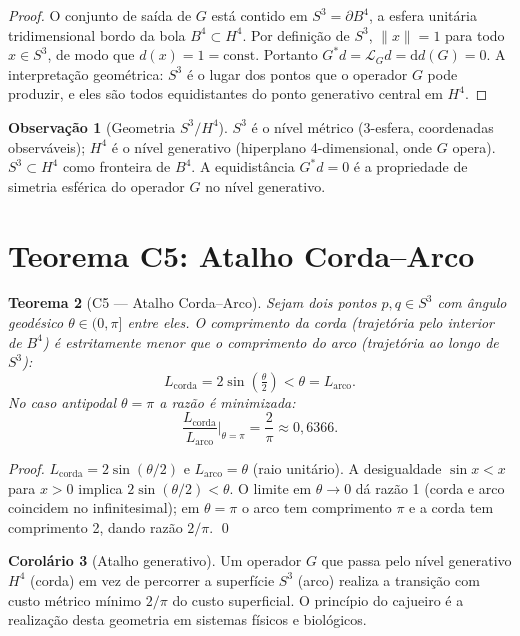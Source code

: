\documentclass[12pt,a4paper,twoside]{book}
\theoremstyle{plain}
\newtheorem{teorema}{Teorema}[section]
\theoremstyle{definition}
\newtheorem{corolario}[teorema]{Corolário}
\theoremstyle{definition}
\newtheorem{observacao}[teorema]{Observação}
\newcommand{\dd}{\mathrm{d}}
\begin{document}
\begin{proof}
O conjunto de saída de $G$ está contido em $S^{3} = \partial B^{4}$, a
esfera unitária tridimensional bordo da bola $B^{4} \subset H^{4}$.
Por definição de $S^{3}$, $\|x\| = 1$ para todo $x \in S^{3}$, de modo
que $d(x) = 1 = \text{const}$. Portanto $G^{*}d = \mathcal{L}_{G}d =
\dd d(G) = 0$. A interpretação geométrica: $S^{3}$ é o lugar dos pontos
que o operador $G$ pode produzir, e eles são todos equidistantes do ponto
generativo central em $H^{4}$.
\end{proof}

\begin{observacao}[Geometria $S^{3}/H^{4}$]
$S^{3}$ é o nível métrico (3-esfera, coordenadas observáveis);
$H^{4}$ é o nível generativo (hiperplano 4-dimensional, onde $G$ opera).
$S^{3} \subset H^{4}$ como fronteira de $B^{4}$. A equidistância
$G^{*}d = 0$ é a propriedade de simetria esférica do operador $G$ no
nível generativo.
\end{observacao}

\section{Teorema C5: Atalho Corda--Arco}
\label{sec:C5}

\begin{teorema}[C5 — Atalho Corda--Arco]\label{thm:C5}
Sejam dois pontos $p, q \in S^{3}$ com ângulo geodésico $\theta \in (0,\pi]$
entre eles. O comprimento da corda (trajetória pelo interior de $B^{4}$)
é estritamente menor que o comprimento do arco (trajetória ao longo de
$S^{3}$):
\[
  L_{\text{corda}} = 2\sin\!\left(\tfrac{\theta}{2}\right) < \theta =
  L_{\text{arco}}.
\]
No caso antipodal $\theta = \pi$ a razão é minimizada:
\[
  \frac{L_{\text{corda}}}{L_{\text{arco}}}\bigg|_{\theta=\pi}
  = \frac{2}{\pi} \approx 0{,}6366.
\]
\end{teorema}

\begin{proof}
$L_{\text{corda}} = 2\sin(\theta/2)$ e $L_{\text{arco}} = \theta$ (raio
unitário). A desigualdade $\sin x < x$ para $x > 0$ implica
$2\sin(\theta/2) < \theta$. O limite em $\theta \to 0$ dá razão 1 (corda e
arco coincidem no infinitesimal); em $\theta = \pi$ o arco tem comprimento
$\pi$ e a corda tem comprimento 2, dando razão $2/\pi$. \qed
\end{proof}

\begin{corolario}[Atalho generativo]
Um operador $G$ que passa pelo nível generativo $H^{4}$ (corda) em vez de
percorrer a superfície $S^{3}$ (arco) realiza a transição com custo
métrico mínimo $2/\pi$ do custo superficial. O princípio do cajueiro é a
realização desta geometria em sistemas físicos e biológicos.
\end{corolario}
\end{document}
